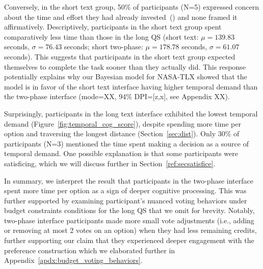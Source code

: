 Conversely, in the short text group, 50\% of participants (N=5) expressed concern about the time and effort they had already invested~() and none framed it affirmatively. Descriptively, participants in the short text group spent comparatively less time than those in the long QS (short text: $\mu=139.83$ seconds, $\sigma=76.43$ seconds; short two-phase: $\mu=178.78$ seconds, $\sigma=61.07$ seconds). This suggests that participants in the short text group expected themselves to complete the task sooner than they actually did. This response potentially explains why our Bayesian model for NASA-TLX showed that the model is in favor of the short text interface having higher temporal demand than the two-phase interface (mode=XX, 94\% DPI=[z,x], see Appendix XX).

Surprisingly, participants in the long text interface exhibited the lowest temporal demand (Figure~\ref{fig:temporal_cog_score}), despite spending more time per option and traversing the longest distance (Section~\ref{sec:dist}). Only 30\% of participants (N=3) mentioned the time spent making a decision as a source of temporal demand. One possible explanation is that some participants were satisficing, which we will discuss further in Section~\ref{ref:secsatisfice}.

In summary, we interpret the result that participants in the two-phase interface spent more time per option as a sign of deeper cognitive processing. This was further supported by examining participant's nuanced voting behaviors under budget constraints conditions for the long QS that we omit for brevity. Notably, two-phase interface participants made more small vote adjustments (i.e., adding or removing at most 2 votes on an option) when they had less remaining credits, further supporting our claim that they experienced deeper engagement with the preference construction which we elaborated further in Appendix~\ref{apdx:budget_voting_behaviors}.